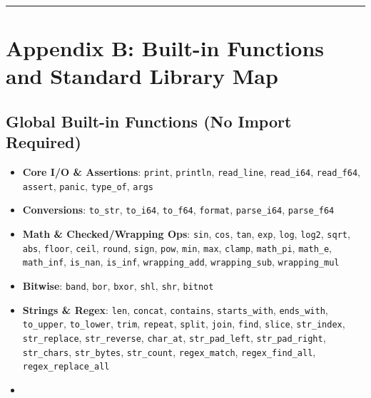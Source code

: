 \documentclass[
  english,
  oneside]{book}
\providecommand{\tightlist}{%
  \setlength{\itemsep}{0pt}\setlength{\parskip}{0pt}}
\begin{document}
\begin{center}\rule{0.5\linewidth}{0.5pt}\end{center}

\chapter{Appendix B: Built-in Functions and Standard Library
Map}\label{appendix-b-built-in-functions-and-standard-library-map}

\section{Global Built-in Functions (No Import
Required)}\label{global-built-in-functions-no-import-required}

\begin{itemize}
\tightlist
\item
  \textbf{Core I/O \& Assertions}: \texttt{print}, \texttt{println},
  \texttt{read\_line}, \texttt{read\_i64}, \texttt{read\_f64},
  \texttt{assert}, \texttt{panic}, \texttt{type\_of}, \texttt{args}
\item
  \textbf{Conversions}: \texttt{to\_str}, \texttt{to\_i64},
  \texttt{to\_f64}, \texttt{format}, \texttt{parse\_i64},
  \texttt{parse\_f64}
\item
  \textbf{Math \& Checked/Wrapping Ops}: \texttt{sin}, \texttt{cos},
  \texttt{tan}, \texttt{exp}, \texttt{log}, \texttt{log2},
  \texttt{sqrt}, \texttt{abs}, \texttt{floor}, \texttt{ceil},
  \texttt{round}, \texttt{sign}, \texttt{pow}, \texttt{min},
  \texttt{max}, \texttt{clamp}, \texttt{math\_pi}, \texttt{math\_e},
  \texttt{math\_inf}, \texttt{is\_nan}, \texttt{is\_inf},
  \texttt{wrapping\_add}, \texttt{wrapping\_sub}, \texttt{wrapping\_mul}
\item
  \textbf{Bitwise}: \texttt{band}, \texttt{bor}, \texttt{bxor},
  \texttt{shl}, \texttt{shr}, \texttt{bitnot}
\item
  \textbf{Strings \& Regex}: \texttt{len}, \texttt{concat},
  \texttt{contains}, \texttt{starts\_with}, \texttt{ends\_with},
  \texttt{to\_upper}, \texttt{to\_lower}, \texttt{trim},
  \texttt{repeat}, \texttt{split}, \texttt{join}, \texttt{find},
  \texttt{slice}, \texttt{str\_index}, \texttt{str\_replace},
  \texttt{str\_reverse}, \texttt{char\_at}, \texttt{str\_pad\_left},
  \texttt{str\_pad\_right}, \texttt{str\_chars}, \texttt{str\_bytes},
  \texttt{str\_count}, \texttt{regex\_match}, \texttt{regex\_find\_all},
  \texttt{regex\_replace\_all}
\item

\end{itemize}
\end{document}
